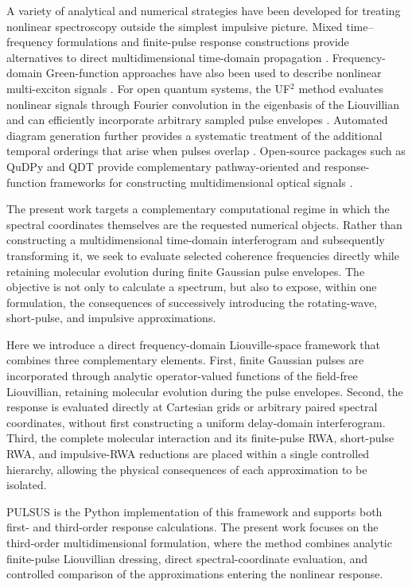 A variety of analytical and numerical strategies have been developed
for treating nonlinear spectroscopy outside the simplest impulsive
picture.
Mixed time--frequency formulations and finite-pulse response
constructions provide alternatives to direct multidimensional
time-domain propagation
\cite{
GelinDomcke2016AlternativeView,
DoGelinTan2017FinitePulse}.
Frequency-domain Green-function approaches have also been used to
describe nonlinear multi-exciton signals
\cite{Roslyak2013Quasiparticle}.
For open quantum systems, the UF$^2$ method evaluates nonlinear signals
through Fourier convolution in the eigenbasis of the Liouvillian and
can efficiently incorporate arbitrary sampled pulse envelopes
\cite{RoseKrich2021UF2}.
Automated diagram generation further provides a systematic treatment
of the additional temporal orderings that arise when pulses overlap
\cite{RoseKrich2021DiagramGenerator}.
Open-source packages such as QuDPy and QDT provide complementary
pathway-oriented and response-function frameworks for constructing
multidimensional optical signals
\cite{shah2023qudpy,Kenneweg2024QDT}.

The present work targets a complementary computational regime in which
the spectral coordinates themselves are the requested numerical
objects. Rather than constructing a multidimensional time-domain
interferogram and subsequently transforming it, we seek to evaluate
selected coherence frequencies directly while retaining molecular
evolution during finite Gaussian pulse envelopes. The objective is not
only to calculate a spectrum, but also to expose, within one
formulation, the consequences of successively introducing the
rotating-wave, short-pulse, and impulsive approximations.

Here we introduce a direct frequency-domain Liouville-space
framework that combines three complementary elements. First,
finite Gaussian pulses are incorporated through analytic
operator-valued functions of the field-free Liouvillian, retaining
molecular evolution during the pulse envelopes. Second, the
response is evaluated directly at Cartesian grids or arbitrary
paired spectral coordinates, without first constructing a uniform
delay-domain interferogram. Third, the complete molecular
interaction and its finite-pulse RWA, short-pulse RWA, and
impulsive-RWA reductions are placed within a single controlled
hierarchy, allowing the physical consequences of each approximation
to be isolated.

PULSUS is the Python implementation of this framework and supports
both first- and third-order response calculations. The present work
focuses on the third-order multidimensional formulation, where the
method combines analytic finite-pulse Liouvillian dressing, direct
spectral-coordinate evaluation, and controlled comparison of the
approximations entering the nonlinear response.

